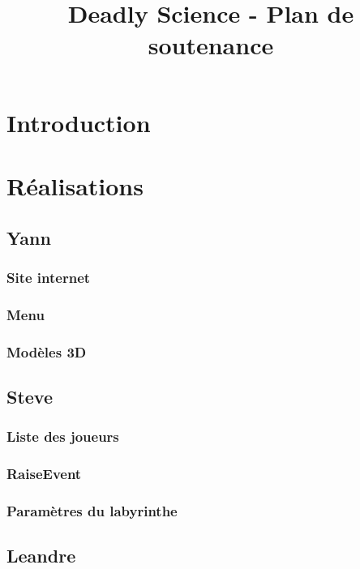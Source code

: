 \documentclass{article}
\title{Deadly Science - Plan de soutenance}
\begin{document}
\maketitle

\section{Introduction}

\section{Réalisations}

\subsection{Yann}

\subsubsection{Site internet}

\subsubsection{Menu}

\subsubsection{Modèles 3D}

\subsection{Steve}

\subsubsection{Liste des joueurs}

\subsubsection{RaiseEvent}

\subsubsection{Paramètres du labyrinthe}

\subsection{Leandre}
\end{document}
